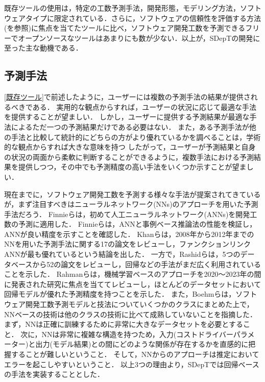 既存ツールの使用は，特定の工数予測手法，開発形態，モデリング方法，ソフトウェアタイプに限定されている．さらに，ソフトウェアの信頼性を評価する方法(\cite{Xiao2024}を参照)に焦点を当てたツールに比べ，ソフトウェア開発工数を予測できるフリーでオープンソースなツールはあまりにも数が少ない．以上が，SDepTの開発に至った主な動機である．


\subsection{予測手法}\label{予測手法}
\ref{既存ツール}で前述したように，ユーザーには複数の予測手法の結果が提供されるべきである．
実用的な観点からすれば，ユーザーの状況に応じて最適な手法を提供することが望ましい．
しかし，ユーザーに提供する予測結果が最適な手法によるただ一つの予測結果だけである必要はない．
また，ある予測手法が他の手法と比較して統計的にどちらの方がより優れているかを調べることは，学術的な観点からすれば大きな意味を持つ
したがって，ユーザーが予測結果と自身の状況の両面から柔軟に判断することができるように，複数手法における予測結果を提供しつつ，その中でも予測精度の高い手法をいくつか示すことが望ましい．

現在までに，ソフトウェア開発工数を予測する様々な手法が提案されてきているが，まず注目すべきはニューラルネットワーク(NNs)のアプローチを用いた予測手法だろう．
Finnieら\cite{Finnie1996}は，初めて人工ニューラルネットワーク(ANNs)を開発工数の予測に適用した．
Finnieら\cite{Finnie1996}は，ANNと事例ベース推論法の性能を検証し，ANNが良い精度を示すことを確認した．
Khanら\cite{Khan2014}は，2008年から2012年までのNNを用いた予測手法に関する17の論文をレビューし，ファンクションリンクANNが最も優れているという結論を出した．
一方で，Rashidら\cite{Rashid2023}は，5つのデータベースから52の論文をレビューし，回帰などの手法がまだ広く利用されていることを示した．
Rahman\cite{Rahman2024}らは，機械学習ベースのアプローチを2020～2023年の間に発表された研究に焦点を当ててレビューし，ほとんどのデータセットにおいて回帰モデルが優れた予測精度を持つことを示した．
また，Boehmら\cite{Boehm2000}は，ソフトウェア開発工数予測モデルと技法についていくつかのクラスにまとめた上で，NNベースの技術は他のクラスの技術に比べて成熟していないことを指摘した．
まず，NNは正確に訓練するために非常に大きなデータセットを必要とすること．
次に，NNは非常に複雑な構造を持つため，入力(コストドライバーパラメーター)と出力(モデル結果)との間にどのような関係が存在するかを直感的に把握することが難しいということ．
そして，NNからのアプローチは推定においてエラーを起こしやすいということ．
以上3つの理由より，SDepTでは回帰ベースの手法を実装することとした．

